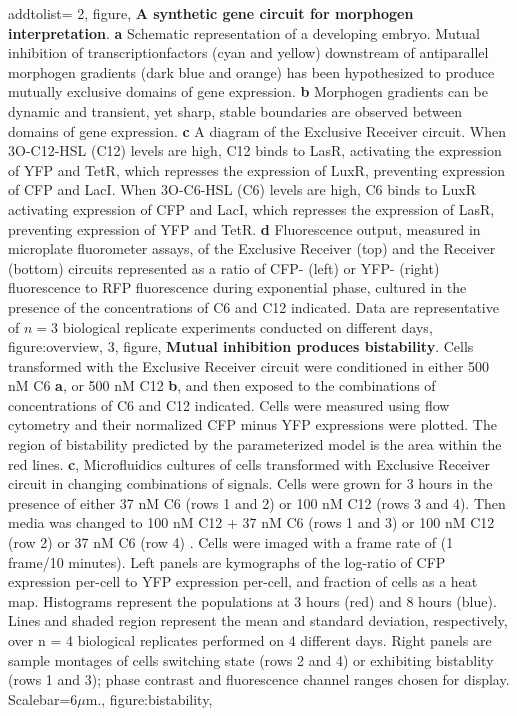     addtolist={
        2, figure, {\textbf{A synthetic gene circuit for morphogen interpretation}. \textbf{a} Schematic representation of a developing embryo. Mutual inhibition of transcriptionfactors (cyan and yellow) downstream of antiparallel morphogen gradients (dark blue and orange) has been hypothesized to produce mutually exclusive domains of gene expression. \textbf{b} Morphogen gradients can be dynamic and transient, yet sharp, stable boundaries are observed between domains of gene expression. \textbf{c} A diagram of the Exclusive Receiver circuit. When 3O-C12-HSL (C12) levels are high, C12 binds to LasR, activating the expression of YFP and TetR, which represses the expression of LuxR, preventing expression of CFP and LacI. When 3O-C6-HSL (C6) levels are high, C6 binds to LuxR activating expression of CFP and LacI, which represses the expression of LasR, preventing expression of YFP and TetR. \textbf{d} Fluorescence output, measured in microplate fluorometer assays, of the Exclusive Receiver (top) and the Receiver (bottom) circuits represented as a ratio of CFP- (left) or YFP- (right) fluorescence to RFP fluorescence during exponential phase, cultured in the presence of the concentrations of C6 and C12 indicated. Data are representative of $n=3$ biological replicate experiments conducted on different days}, figure:overview,
        3, figure, {\textbf{Mutual inhibition produces bistability}. Cells transformed with the Exclusive Receiver circuit were conditioned in either 500 nM C6 \textbf{a}, or 500 nM C12 \textbf{b}, and then exposed to the combinations of concentrations of C6 and C12 indicated.  Cells were measured using flow cytometry and their normalized CFP minus YFP expressions were plotted. The region of bistability predicted by the parameterized model is the area within the red lines.  \textbf{c}, Microfluidics cultures of cells transformed with Exclusive Receiver circuit in changing combinations of signals.  Cells were grown for 3 hours in the presence of either 37 nM C6 (rows 1 and 2) or 100 nM C12 (rows 3 and 4). Then media was changed to 100 nM C12 + 37 nM C6 (rows 1 and 3) or 100 nM C12 (row 2) or 37 nM C6 (row 4) . Cells were imaged with a frame rate of (1 frame/10 minutes). Left panels are kymographs of the log-ratio of CFP expression per-cell to YFP expression per-cell, and fraction of cells as a heat map.  Histograms represent the populations at 3 hours (red) and 8 hours (blue).  Lines and shaded region represent the mean and standard deviation, respectively, over {n = 4  biological replicates performed on 4 different days.} Right panels are sample montages of cells switching state (rows 2 and 4) or exhibiting bistablity (rows 1 and 3); phase contrast and fluorescence channel ranges chosen for display. Scalebar=6$\mu$m.}, figure:bistability,
}

